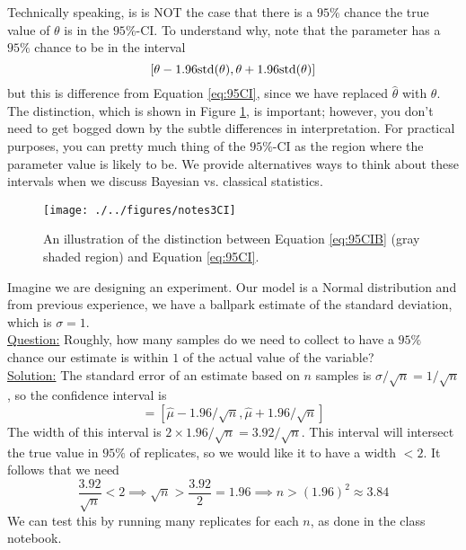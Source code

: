 Technically speaking, is is NOT the case that there is a $95\%$ chance the true value of $\theta$ is in the $95\%$-CI. 
To understand why, note that the parameter has a $95\%$ chance to be in the interval 
\begin{equation}\label{eq:95CIB}
[\theta - 1.96{\rm std}(\theta),\theta + 1.96{\rm std}(\theta)]
\end{equation}
but this is difference from Equation \ref{eq:95CI}, since we have replaced $\hat{\theta}$ with $\theta$. The distinction, which is shown in Figure \ref{fig:CI}, is important; however, you don't need to get bogged down by the subtle differences in interpretation. For practical purposes, you can pretty much thing of the $95\%$-CI as the region where the parameter value is likely to be. We provide alternatives ways to think about these intervals when we discuss Bayesian vs. classical statistics. 


\begin{figure}[h]
\centering
\texttt{[image: ./../figures/notes3CI]}
\caption{An illustration of the distinction between Equation \ref{eq:95CIB} (gray shaded region) and Equation \ref{eq:95CI}.   }\label{fig:CI}
\end{figure}

\begin{example}[Estimating CI]
Imagine we are designing an experiment. Our model is a Normal distribution and from previous experience, we have a ballpark estimate of the standard deviation, which is $\sigma = 1$.  \\



\noindent
\underline{Question:} Roughly, how many samples do we need to collect to have a $95\%$ chance our estimate is within $1$ of the actual value of the variable?\\



\noindent
\underline{Solution:} The standard error of an estimate based on $n$ samples is $\sigma/\sqrt{n} = 1/\sqrt{n}$, so the confidence interval is 
\begin{equation*}
[\hat{\mu}-1.96 \times 1/\sqrt{n},\hat{\mu} +  1.96 \times 1/\sqrt{n}] = [\hat{\mu}-1.96/\sqrt{n},\hat{\mu} +  1.96/\sqrt{n}]
\end{equation*}
The width of this interval is $2 \times 1.96/\sqrt{n} = 3.92/\sqrt{n}$. This interval will intersect the true value in $95\%$ of replicates, so we would like it to have a width $<2$. It follows that we need 
\begin{equation*}
\frac{3.92}{\sqrt{n}} < 2 \implies \sqrt{n} > \frac{3.92}{2} = 1.96 \implies n > (1.96)^2 \approx 3.84
\end{equation*}
We can test this by running many replicates for each $n$, as done in the class notebook. 
\end{example}




